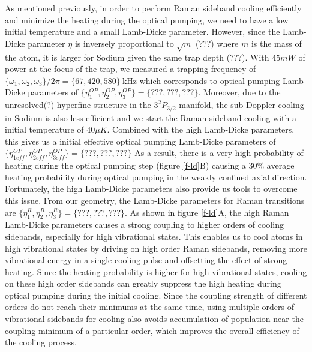 \documentclass[aps,prl,twocolumn,groupedaddress]{revtex4-1}
\begin{document}
As mentioned previously, in order to perform Raman sideband cooling efficiently and
minimize the heating during the optical pumping, we need to have a low initial temperature and
a small Lamb-Dicke parameter. However, since the Lamb-Dicke parameter $\eta$ is inversely
proportional to $\sqrt{m}$ (???) where $m$ is the mass of the atom, it is larger for Sodium
given the same trap depth (???). With $45mW$ of power at the focus of the trap,
we measured a trapping frequency of $\{\omega_1,\omega_2,\omega_3\}/2\pi = \{67, 420, 580\}\ \text{kHz}$
which corresponds to optical pumping Lamb-Dicke parameters of
$\{\eta^{OP}_1,\eta^{OP}_2,\eta^{OP}_3\} = \{???, ???, ???\}$.
Moreover, due to the unresolved(?) hyperfine structure in the $3^2P_{3/2}$ manifold,
the sub-Doppler cooling in Sodium is also less efficient and we start the
Raman sideband cooling with a initial temperature of $40\mu K$. Combined with the high Lamb-Dicke
parameters, this gives us a initial effective optical pumping Lamb-Dicke parameters of
$\{\eta^{OP}_{1eff},\eta^{OP}_{2eff},\eta^{OP}_{3eff}\} = \{???, ???, ???\}$
As a result, there is a very high probability of heating during the optical pumping step
(figure \ref{f-ld}B) causing a $30\%$ average heating probability during optical pumping
in the weakly confined axial direction. Fortunately, the high Lamb-Dicke parameters also
provide us tools to overcome this issue. From our geometry, the Lamb-Dicke parameters for
Raman transitions are $\{\eta^R_{1},\eta^R_{2},\eta^R_{3}\} = \{???, ???, ???\}$. As shown in
figure \ref{f-ld}A, the high Raman Lamb-Dicke parameters causes a strong coupling to higher orders
of cooling sidebands, especially for high vibrational states.
This enables us to cool atoms in high vibrational states by driving on high order Raman sidebands,
removing more vibrational energy in a single cooling pulse and offsetting the effect of
strong heating. Since the heating probability is higher for high vibrational states,
cooling on these high order sidebands can greatly suppress the high heating during
optical pumping during the initial cooling. Since the coupling strength of different orders
do not reach their minimums at the same time, using multiple orders of vibrational sidebands
for cooling also avoids accumulation of population near the coupling minimum of a particular
order, which improves the overall efficiency of the cooling process.
\end{document}
